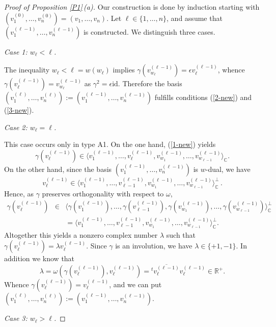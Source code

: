 \documentclass{amsart}
\theoremstyle{definition}
\begin{document}
\begin{proof}[Proof of Proposition \ref{P1}\,{\rm (a)}]
Our construction is done by induction starting with $(v_1^{(0)},\ldots,v_n^{(0)})=(v_1,\ldots,v_n)$.
Let $\ell\in\{1,\ldots,n\}$, and assume that $(v_1^{(\ell-1)},\ldots,v_n^{(\ell-1)})$ is constructed.
We distinguish three cases.

\smallskip
\noindent
{\it Case 1: $w_\ell<\ell$.}

The inequality $w_\ell<\ell=w(w_\ell)$ implies $\gamma(v_{w_\ell}^{(\ell-1)})=\epsilon v_{\ell}^{(\ell-1)}$, whence
$\gamma(v_{\ell}^{(\ell-1)})=v_{w_\ell}^{(\ell-1)}$ as $\gamma^2=\epsilon\mathrm{id}$.
Therefore the basis $(v_1^{(\ell)},\ldots,v_n^{(\ell)}):=(v_1^{(\ell-1)},\ldots,v_n^{(\ell-1)})$ fulfills conditions (\ref{2-new}) and (\ref{3-new}).

\smallskip
\noindent
{\it Case 2: $w_\ell=\ell$.}

This case occurs only in type A1.
On the one hand, (\ref{1-new}) yields
\[\gamma(v_\ell^{(\ell-1)})\in\langle v_1^{(\ell-1)},\ldots,v_\ell^{(\ell-1)},v_{w_1}^{(\ell-1)},\ldots,v_{w_{\ell-1}}^{(\ell-1)}\rangle_\mathbb{C}.\]
On the other hand, since the basis $(v_1^{(\ell-1)},\ldots,v_n^{(\ell-1)})$ is $w$-dual,
we have
\[v_\ell^{(\ell-1)}\in\langle v_1^{(\ell-1)},\ldots,v_{\ell-1}^{(\ell-1)},v_{w_1}^{(\ell-1)},\ldots,v_{w_{\ell-1}}^{(\ell-1)}\rangle_\mathbb{C}^\perp\,.\]
Hence, as $\gamma$ preserves orthogonality with respect to $\omega$,
\begin{eqnarray*}
\gamma(v_\ell^{(\ell-1)}) & \in & \langle \gamma(v_1^{(\ell-1)}),\ldots,\gamma(v_{\ell-1}^{(\ell-1)}),\gamma(v_{w_1}^{(\ell-1)}),\ldots,\gamma(v_{w_{\ell-1}}^{(\ell-1)})\rangle_\mathbb{C}^\perp \\
 & & =\langle v_1^{(\ell-1)},\ldots,v_{\ell-1}^{(\ell-1)},v_{w_1}^{(\ell-1)},\ldots,v_{w_{\ell-1}}^{(\ell-1)}\rangle_\mathbb{C}^\perp.
\end{eqnarray*}
Altogether this yields a nonzero complex number $\lambda$ such that $\gamma(v_\ell^{(\ell-1)})=\lambda v_\ell^{(\ell-1)}$.
Since $\gamma$ is an involution, we have $\lambda\in\{+1,-1\}$.
In addition we know that 
\[\lambda=\omega(\gamma(v_\ell^{(\ell-1)}),v_\ell^{(\ell-1)})={}^t\overline{v_\ell^{(\ell-1)}} v_\ell^{(\ell-1)}\in\mathbb{R}^+.\]
Whence $\gamma(v_\ell^{(\ell-1)})=v_\ell^{(\ell-1)}$, and we can put
$(v_1^{(\ell)},\ldots,v_n^{(\ell)}):=(v_1^{(\ell-1)},\ldots,v_n^{(\ell-1)})$.

\smallskip
\noindent
{\it Case 3: $w_\ell>\ell$.}


\end{proof}
\end{document}
